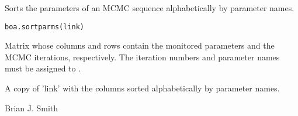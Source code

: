 \begin{Description}\relax
Sorts the parameters of an MCMC sequence alphabetically by parameter names.
\end{Description}
\begin{Usage}
\begin{verbatim}
boa.sortparms(link)
\end{verbatim}
\end{Usage}
\begin{Arguments}
\begin{ldescription}
\item[\code{link}] Matrix whose columns and rows contain the monitored parameters 
and the MCMC iterations, respectively. The iteration numbers and parameter 
names must be assigned to .
\end{ldescription}
\end{Arguments}
\begin{Value}
A copy of 'link' with the columns sorted alphabetically by parameter names.
\end{Value}
\begin{Author}\relax
Brian J. Smith
\end{Author}
\begin{SeeAlso}\relax
{}
\end{SeeAlso}

